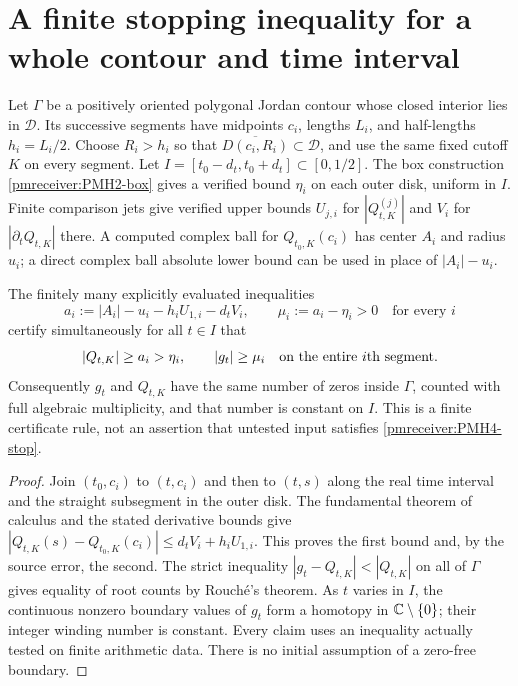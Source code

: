 \section{A finite stopping inequality for a whole contour and time interval}

Let $\Gamma$ be a positively oriented polygonal Jordan contour
whose closed interior lies in $\mathcal D$. Its successive segments
have midpoints $c_i$, lengths $L_i$, and half-lengths $h_i=L_i/2$.
Choose $R_i>h_i$ so that
$\overline{D(c_i,R_i)}\subset\mathcal D$, and use the same fixed
cutoff $K$ on every segment. Let $I=[t_0-d_t,t_0+d_t]\subset[0,1/2]$.
The box construction \eqref{pmreceiver:PMH2-box} gives a verified bound $\eta_i$
on each outer disk, uniform in $I$. Finite comparison jets give
verified upper bounds $U_{j,i}$ for $|Q_{t,K}^{(j)}|$ and $V_i$ for
$|\partial_tQ_{t,K}|$ there. A computed complex ball for
$Q_{t_0,K}(c_i)$ has center $A_i$ and radius $u_i$; a direct complex
ball absolute lower bound can be used in place of $|A_i|-u_i$.

\begin{pmreceivertheorem}
\label{pmreceiver:PMH4}
The finitely many explicitly evaluated inequalities
\begin{equation}\label{pmreceiver:PMH4-stop}
 a_i:=|A_i|-u_i-h_iU_{1,i}-d_tV_i,\qquad
 \mu_i:=a_i-\eta_i>0\quad\text{for every }i
\end{equation}
certify simultaneously for all $t\in I$ that
\[
 |Q_{t,K}|\ge a_i>\eta_i,\qquad |g_t|\ge\mu_i
 \quad\hbox{on the entire $i$th segment.}
\]
Consequently $g_t$ and $Q_{t,K}$ have the same number of zeros
inside $\Gamma$, counted with full algebraic multiplicity, and that
number is constant on $I$. This is a finite certificate rule, not an
assertion that untested input satisfies \eqref{pmreceiver:PMH4-stop}.
\end{pmreceivertheorem}
\begin{proof}
Join $(t_0,c_i)$ to $(t,c_i)$ and then to $(t,s)$ along the real time
interval and the straight subsegment in the outer disk. The
fundamental theorem of calculus and the stated derivative bounds
give
$|Q_{t,K}(s)-Q_{t_0,K}(c_i)|\le d_tV_i+h_iU_{1,i}$.
This proves the first bound and, by the source error, the second.
The strict inequality $|g_t-Q_{t,K}|<|Q_{t,K}|$ on all of $\Gamma$
gives equality of root counts by Rouch\'e's theorem. As $t$ varies in
$I$, the continuous nonzero boundary values of $g_t$ form a homotopy
in $\mathbb C\setminus\{0\}$; their integer winding number is constant.
Every claim uses an inequality actually tested on finite arithmetic
data. There is no initial assumption of a zero-free boundary.
\end{proof}

